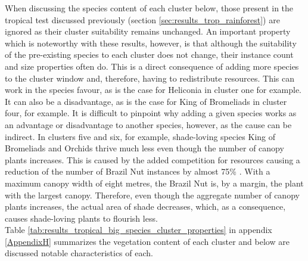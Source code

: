 When discussing the species content of each cluster below, those present in the tropical test discussed previously (section \ref{sec:results_trop_rainforest}) are ignored as their cluster suitability remains unchanged. An important property which is noteworthy with these results, however, is that although the suitability of the pre-existing species to each cluster does not change, their instance count and size properties often do. This is a direct consequence of adding more species to the cluster window and, therefore, having to redistribute resources. This can work in the species favour, as is the case for Heliconia in cluster one for example. It can also be a disadvantage, as is the case for King of Bromeliads in cluster four, for example. It is difficult to pinpoint why adding a given species works as an advantage or disadvantage to another species, however, as the cause can be indirect. In clusters five and six, for example, shade-loving species King of Bromeliads and Orchids thrive much less even though the number of canopy plants increases. This is caused by the added competition for resources causing a reduction of the number of Brazil Nut instances by almost 75\% . With a maximum canopy width of eight metres, the Brazil Nut is, by a margin, the plant with the largest canopy. Therefore, even though the aggregate number of canopy plants increases, the actual area of shade decreases, which, as a consequence, causes shade-loving plants to flourish less.\\



Table \ref{tab:results_tropical_big_species_cluster_properties} in appendix \ref{AppendixH} summarizes the vegetation content of each cluster and below are discussed notable characteristics of each.



